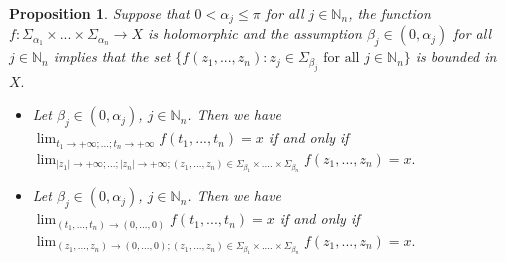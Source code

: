 \documentclass{amsart}
\newtheorem{prop}[thm]{Proposition}
\theoremstyle{definition}
\theoremstyle{remark}
\numberwithin{equation}{section}
\begin{document}
\begin{prop}\label{holo}
Suppose that $0<\alpha_{j}\leq \pi$ for all $j\in {\mathbb N}_{n}$, the function $f : \Sigma_{\alpha_{1}} \times ... \times  \Sigma_{\alpha_{n}} \rightarrow X$ is holomorphic and the assumption $\beta_{j}\in (0,\alpha_{j})$ for all $ j\in {\mathbb N}_{n}$ implies that the set $\{f(z_{1},...,z_{n}) : z_{j}\in \Sigma_{\beta_{j}}\mbox{ for all }j\in {\mathbb N}_{n}\}$ is bounded in $X.$
\begin{itemize}
\item[(i)] Let $\beta_{j}\in (0,\alpha_{j})$, $ j\in {\mathbb N}_{n}$. Then we have $\lim_{t_{1}\rightarrow +\infty;...;t_{n}\rightarrow +\infty}f(t_{1},...,t_{n})=x$ if and only if $\lim_{|z_{1}|\rightarrow +\infty;...;|z_{n}|\rightarrow +\infty; (z_{1},...,z_{n})\in \Sigma_{\beta_{1}}\times .... \times \Sigma_{\beta_{n}}}f(z_{1},...,z_{n})=x.$
\item[(ii)]  Let $\beta_{j}\in (0,\alpha_{j})$, $ j\in {\mathbb N}_{n}$. Then we have $\lim_{(t_{1},...,t_{n})\rightarrow (0,...,0)}f(t_{1},...,t_{n})=x$ if and only if $\lim_{(z_{1},...,z_{n})\rightarrow (0,...,0); (z_{1},...,z_{n})\in \Sigma_{\beta_{1}}\times .... \times \Sigma_{\beta_{n}}}f(z_{1},...,z_{n})=x.$
\end{itemize}
\end{prop}
\end{document}
